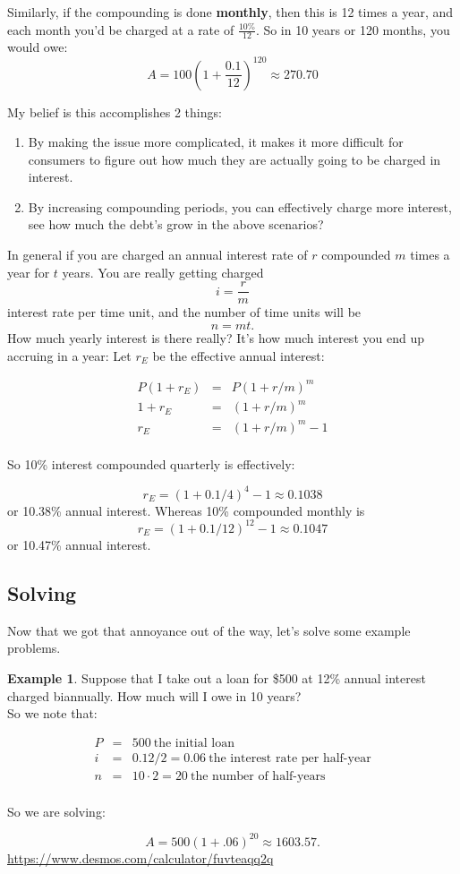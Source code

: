 \documentclass[10pt]{article}
\theoremstyle{definition}
\newtheorem{example}[equation]{Example}
\begin{document}
Similarly, if the compounding is done  {\bf monthly}, then this is 12 times a year, and each month you'd be charged at a rate of $\frac{10\%}{12}$.  So in 10 years or 120 months, you would owe: $$A=100(1+\frac{0.1}{12})^{120}\approx 270.70$$

My belief is this accomplishes 2 things:

\begin{enumerate}
\item By making the issue more complicated, it makes it more difficult for consumers to figure out how much they are actually going to be charged in interest.
\item By increasing compounding periods, you can effectively charge more interest, see how much the debt's grow in the above scenarios?
\end{enumerate}

In general if you are charged an annual interest rate of $r$ compounded $m$ times a year for $t$ years.  You are really getting charged $$i=\frac{r}{m}$$ interest rate per time unit, and the number of time units will be $$n=mt.$$  How much yearly interest is there really?  It's how much interest you end up accruing in a year:  Let $r_E$ be the effective annual interest:

\begin{eqnarray*}
P(1+r_E)&=&P(1+r/m)^{m}\\
1+r_E&=&(1+r/m)^{m}\\
r_E&=&(1+r/m)^{m}-1\\
\end{eqnarray*}


So 10\% interest compounded quarterly is effectively:

$$r_E=(1+0.1/4)^4-1\approx0.1038$$ or 10.38\% annual interest.  Whereas 10\% compounded monthly is $$r_E=(1+0.1/12)^{12}-1\approx 0.1047$$ or 10.47\% annual interest.




\subsection{Solving}

Now that we got that annoyance out of the way, let's solve some example problems.

\begin{example}
Suppose that I take out a loan for \$500 at 12\% annual interest charged biannually.  How much will I owe in 10 years?\\

So we note that:

\begin{eqnarray*}
P&=&500\ \text{the initial loan}\\
i&=&0.12/2=0.06 \ \text{the interest rate per half-year}\\
n&=&10\cdot 2=20 \ \text{the number of half-years}\\
\end{eqnarray*}

So we are solving:

$$A=500(1+.06)^{20}\approx 1603.57.$$ \url{https://www.desmos.com/calculator/fuvteaqq2q}

\end{example}
\end{document}
